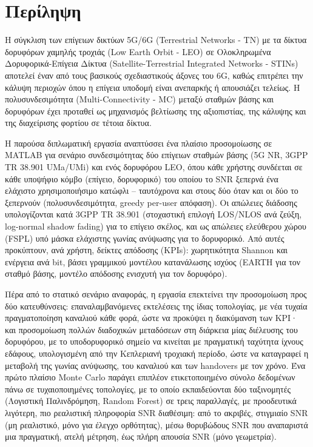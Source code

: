 \chapter*{Περίληψη}

Η σύγκλιση των επίγειων δικτύων 5G/6G (Terrestrial Networks - TN) με τα
δίκτυα δορυφόρων χαμηλής τροχιάς (Low Earth Orbit - LEO) σε Ολοκληρωμένα
Δορυφορικά-Επίγεια Δίκτυα (Satellite-Terrestrial Integrated Networks -
STINs) αποτελεί έναν από τους βασικούς σχεδιαστικούς άξονες του 6G,
καθώς επιτρέπει την κάλυψη περιοχών όπου η επίγεια υποδομή είναι
ανεπαρκής ή απουσιάζει τελείως. Η πολυσυνδεσιμότητα (Multi-Connectivity
- MC) μεταξύ σταθμών βάσης και δορυφόρων έχει προταθεί ως μηχανισμός
βελτίωσης της αξιοπιστίας, της κάλυψης και της διαχείρισης φορτίου σε
τέτοια δίκτυα.

Η παρούσα διπλωματική εργασία αναπτύσσει ένα πλαίσιο προσομοίωσης σε
MATLAB για σενάριο συνδεσιμότητας δύο επίγειων σταθμών βάσης (5G NR,
3GPP TR 38.901 UMa/UMi) και ενός δορυφόρου LEO, όπου κάθε χρήστης
συνδέεται σε κάθε υποψήφιο κόμβο (επίγειο, δορυφορικό) του οποίου το SNR
ξεπερνά ένα ελάχιστο χρησιμοποιήσιμο κατώφλι -- ταυτόχρονα και στους
δύο όταν και οι δύο το ξεπερνούν (πολυσυνδεσιμότητα, greedy per-user
απόφαση). Οι απώλειες διάδοσης
υπολογίζονται κατά 3GPP TR 38.901 (στοχαστική επιλογή LOS/NLOS ανά
ζεύξη, log-normal shadow fading) για το επίγειο σκέλος, και ως απώλειες
ελεύθερου χώρου (FSPL) υπό μάσκα ελάχιστης γωνίας ανύψωσης για το
δορυφορικό. Από αυτές προκύπτουν, ανά χρήστη, δείκτες απόδοσης (KPIs):
χωρητικότητα Shannon και ενέργεια ανά bit, βάσει γραμμικού μοντέλου
κατανάλωσης ισχύος (EARTH για τον σταθμό βάσης, μοντέλο απόδοσης
ενισχυτή για τον δορυφόρο).

Πέρα από το στατικό σενάριο αναφοράς, η εργασία επεκτείνει την
προσομοίωση προς δύο κατευθύνσεις: επαναλαμβανόμενες εκτελέσεις της
ίδιας τοπολογίας, με νέα τυχαία πραγματοποίηση καναλιού κάθε φορά, ώστε
να προκύψει η διακύμανση των KPI· και προσομοίωση πολλών διαδοχικών
μεταδόσεων στη διάρκεια μίας διέλευσης του δορυφόρου, με το
υποδορυφορικό σημείο να κινείται με πραγματική ταχύτητα ίχνους εδάφους,
υπολογισμένη από την Κεπλεριανή τροχιακή περίοδο, ώστε να καταγραφεί η
μεταβολή της γωνίας ανύψωσης, του καναλιού και των handovers με τον
χρόνο. Ένα πρώτο πλαίσιο Monte Carlo παράγει επιπλέον ετικετοποιημένο
σύνολο δεδομένων πάνω σε τυχαιοποιημένες τοπολογίες, με το οποίο
εκπαιδεύονται δύο ταξινομητές (Λογιστική Παλινδρόμηση, Random Forest) σε
τρεις παραλλαγές, με προοδευτικά λιγότερη, πιο ρεαλιστική πληροφορία SNR
διαθέσιμη: από το ακριβές, στιγμιαίο SNR (μη ρεαλιστικό, μόνο για έλεγχο
ορθότητας), μέσω θορυβώδους SNR που αναπαριστά μια πραγματική, ατελή
μέτρηση, έως πλήρη απουσία SNR (μόνο γεωμετρία).

